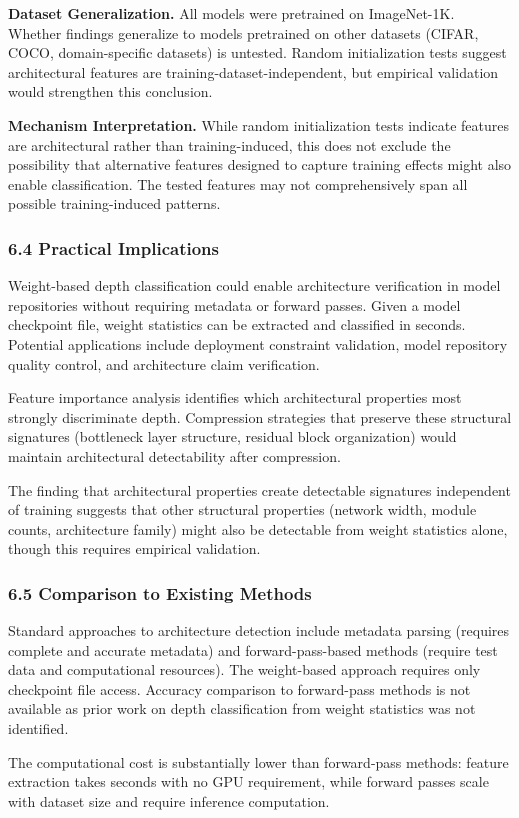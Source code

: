 \textbf{Dataset Generalization.} All models were pretrained on ImageNet-1K. Whether findings generalize to models pretrained on other datasets (CIFAR, COCO, domain-specific datasets) is untested. Random initialization tests suggest architectural features are training-dataset-independent, but empirical validation would strengthen this conclusion.

\textbf{Mechanism Interpretation.} While random initialization tests indicate features are architectural rather than training-induced, this does not exclude the possibility that alternative features designed to capture training effects might also enable classification. The tested features may not comprehensively span all possible training-induced patterns.

\subsubsection{6.4 Practical Implications}

Weight-based depth classification could enable architecture verification in model repositories without requiring metadata or forward passes. Given a model checkpoint file, weight statistics can be extracted and classified in seconds. Potential applications include deployment constraint validation, model repository quality control, and architecture claim verification.

Feature importance analysis identifies which architectural properties most strongly discriminate depth. Compression strategies that preserve these structural signatures (bottleneck layer structure, residual block organization) would maintain architectural detectability after compression.

The finding that architectural properties create detectable signatures independent of training suggests that other structural properties (network width, module counts, architecture family) might also be detectable from weight statistics alone, though this requires empirical validation.

\subsubsection{6.5 Comparison to Existing Methods}

Standard approaches to architecture detection include metadata parsing (requires complete and accurate metadata) and forward-pass-based methods (require test data and computational resources). The weight-based approach requires only checkpoint file access. Accuracy comparison to forward-pass methods is not available as prior work on depth classification from weight statistics was not identified.

The computational cost is substantially lower than forward-pass methods: feature extraction takes seconds with no GPU requirement, while forward passes scale with dataset size and require inference computation.
